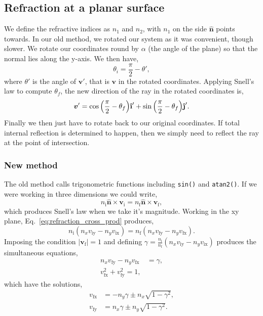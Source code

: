 \documentclass{article}
\let\vec \bm
\newcommand{\uveci}{{\bm{\hat{\textnormal{\bfseries\i}}}}}
\newcommand{\uvecj}{{\bm{\hat{\textnormal{\bfseries\j}}}}}
\newcommand{\mrm}[1]{\mathrm{#1}}
\begin{document}
\subsection{Refraction at a planar surface}
We define the refractive indices as $n_1$ and $n_2$, with $n_1$ on the side $\vec{\hat{n}}$ points towards. In our old method, we rotated our system as it was convenient, though slower. We rotate our coordinates round by $\alpha$ (the angle of the plane) so that the normal lies along the y-axis. We then have,
\begin{equation}
    \theta_i 
    =
    \frac{\pi}{2} - \theta',
\end{equation}
where $\theta'$ is the angle of $\vec{v}'$, that is $\vec v$ in the rotated coordinates. Applying Snell's law to compute $\theta_f$, the new direction of the ray in the rotated coordinates is,
\begin{equation}
    \vec{v}'
    = 
    \cos{
    \left(
        \frac{\pi}{2} - \theta_f
    \right)
    } \uveci'
    +
    \sin{
    \left(
        \frac{\pi}{2} - \theta_f
    \right)
    } \uvecj'.
\end{equation}
Finally we then just have to rotate back to our original coordinates. If total internal reflection is determined to happen, then we simply need to reflect the ray at the point of intersection.

\subsubsection{New method}
The old method calls trigonometric functions including \texttt{sin()} and \texttt{atan2()}. If we were working in three dimensions we could write,
\begin{equation}
\label{eq:refraction_cross_prod}
    n_\mrm{i} \vec{\hat n} \times \vec{v}_\mrm{i} = n_\mrm{f} \vec{\hat n} \times \vec{v}_\mrm{f},
\end{equation}
which produces Snell's law when we take it's magnitude. Working in the xy plane, Eq.~\ref{eq:refraction_cross_prod} produces,
\begin{equation}
    n_\mrm{i} (n_x v_\mrm{iy} - n_y v_\mrm{ix})
    =
    n_\mrm{f} (n_x v_\mrm{fy} - n_y v_\mrm{fx}).
\end{equation}
Imposing the condition $|\vec{v}_\mrm{f}| = 1$ and defining $\gamma = \frac{n_\mrm{i}}{n_\mrm{f}} (n_x v_\mrm{iy} - n_y v_\mrm{ix})$ produces the simultaneous equations,
\begin{align}
    n_x v_\mrm{fy} - n_y v_\mrm{fx}
    &=
    \gamma, \\
    v_\mrm{fx}^2 + v_\mrm{fy}^2 = 1,
\end{align}
which have the solutions,
\begin{align}
\label{eq:refr_v_x}
    v_\mrm{fx} &= -n_y \gamma \pm n_x \sqrt{1-\gamma^2}, \\
\label{eq:refr_v_y}
    v_\mrm{fy} &= n_x \gamma \pm n_y \sqrt{1-\gamma^2}.
\end{align}
\end{document}
